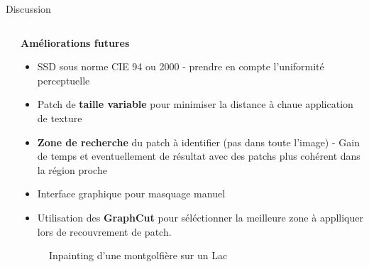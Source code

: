 \documentclass[final,hyperref={pdfpagelabels=false}]{beamer}
\begin{document}
\begin{frame}[t]
\begin{columns}[t]
\begin{column}{.930\textwidth}
\begin{block}{\Large Discussion}
\begin{columns}[t]
\begin{column}{.496\textwidth}
\end{column}
\begin{column}{.496\textwidth} 
\textbf{Améliorations futures}
\begin{itemize}
\item SSD sous norme CIE 94 ou 2000 - prendre en compte l'uniformité perceptuelle
\item Patch de \textbf{taille variable} pour minimiser la distance à chaue application de texture
\item \textbf{Zone de recherche} du patch à identifier (pas dans toute l'image) - Gain de temps et eventuellement de résultat avec des patchs plus cohérent dans la région proche
\item Interface graphique pour masquage manuel 
\item Utilisation des \textbf{GraphCut} pour séléctionner la meilleure zone à applliquer lors de recouvrement de patch. 
\end{itemize}

\begin{figure}[H]
\centering
{}
\caption{Inpainting d'une montgolfière sur un Lac}
\end{figure}


\end{column}
\end{columns}
\end{block}
\end{column}
\end{columns}
\end{frame}
\end{document}
